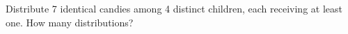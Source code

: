 Distribute 7 identical candies among 4 distinct children, each receiving at least one. How many distributions?
